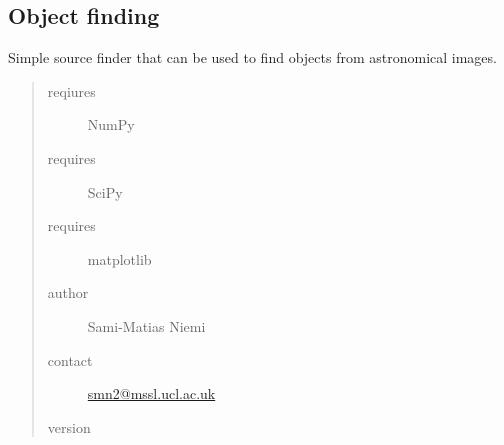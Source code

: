 \documentclass[a4paper,12pt,english]{sphinxmanual}
\begin{document}
\label{analysis:module-analysis.sourceFinder}

\subsection{Object finding}
\label{analysis:object-finding}
Simple source finder that can be used to find objects from astronomical images.
\begin{quote}\begin{description}
\item[{reqiures}] \leavevmode
NumPy

\item[{requires}] \leavevmode
SciPy

\item[{requires}] \leavevmode
matplotlib

\item[{author}] \leavevmode
Sami-Matias Niemi

\item[{contact}] \leavevmode
\href{mailto:smn2@mssl.ucl.ac.uk}{smn2@mssl.ucl.ac.uk}

\item[{version}] 

\end{description}\end{quote}
\end{document}
